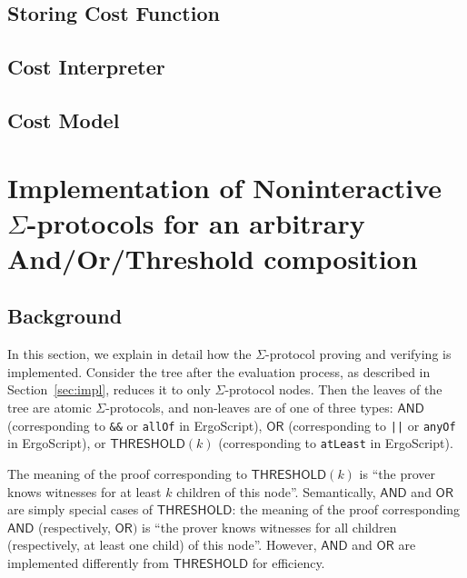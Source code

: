 \documentclass[11pt]{article}
\newcommand{\langname}{ErgoScript\xspace}
\newcommand{\andnode}{\ensuremath{\mathsf{AND}}}
\newcommand{\ornode}{\ensuremath{\mathsf{OR}}}
\newcommand{\tnode}{\ensuremath{\mathsf{THRESHOLD}}}
\begin{document}
\subsection{Storing Cost Function}
\label{sec:store-cost-function}


\subsection{Cost Interpreter}
\label{sec:cost-interpreter}



\subsection{Cost Model}
\label{sec:cost-model}











\appendix



\section{Implementation of Noninteractive $\Sigma$-protocols for an arbitrary And/Or/Threshold composition}
\label{app:crypto}
\subsection{Background}


In this section, we explain in detail how the $\Sigma$-protocol proving and verifying is implemented. Consider the tree after the evaluation process, as described in Section~\ref{sec:impl}, reduces it to only $\Sigma$-protocol nodes. Then the leaves of the tree are atomic $\Sigma$-protocols, and non-leaves are of one of three types: $\andnode$ (corresponding to \texttt{\&\&} or \texttt{allOf} in \langname), $\ornode$ (corresponding to \texttt{||} or \texttt{anyOf} in \langname), or $\tnode(k)$ (corresponding to \texttt{atLeast} in \langname). 

The meaning of the proof corresponding to $\tnode(k)$ is ``the prover knows witnesses for at least $k$ children of this node''. Semantically, $\andnode$ and $\ornode$ are simply special cases of $\tnode$: the meaning  of the proof corresponding $\andnode$ (respectively, $\ornode)$ is ``the prover knows witnesses for all children (respectively, at least one child) of this node''. However, $\andnode$ and $\ornode$ are implemented differently from $\tnode$ for efficiency.
\end{document}
